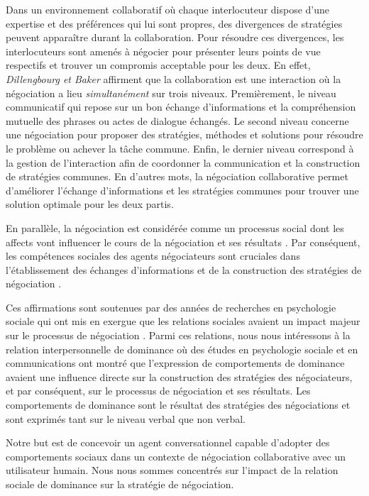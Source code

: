Dans un environnement collaboratif où chaque interlocuteur dispose d'une expertise et des préférences qui lui sont propres, des divergences de stratégies peuvent apparaître durant la collaboration. 
Pour résoudre ces divergences, les interlocuteurs sont amenés à négocier pour présenter leurs points de vue respectifs et trouver un compromis acceptable pour les deux.  
En effet, \emph{Dillengbourg et Baker} \cite{dillenbourg1996negotiation} affirment que la collaboration est une interaction où la négociation a lieu \textit{simultanément} sur trois niveaux. Premièrement, le niveau communicatif qui repose sur un bon échange d'informations et la compréhension mutuelle des phrases ou actes de dialogue échangés. Le second niveau concerne une négociation pour proposer des stratégies, méthodes et solutions pour résoudre le problème ou achever la tâche commune. Enfin, le dernier niveau correspond à la gestion de l'interaction afin de coordonner la communication et la construction de stratégies communes. En d'autres mots, la négociation collaborative permet d'améliorer l'échange d'informations et les stratégies communes pour trouver une solution optimale pour les deux partis. 

En parallèle, la négociation est  considérée comme un processus social dont les affects vont influencer le cours de la négociation et ses résultats \cite{broekens2010affective}. Par conséquent, les compétences sociales des agents négociateurs sont cruciales dans l'établissement des échanges d'informations et de la construction des stratégies de négociation \cite{jin2010study}. 

Ces affirmations sont soutenues par des années de recherches en psychologie sociale qui ont mis en exergue que les relations sociales avaient un impact majeur sur le processus de négociation \cite{thompson2010negotiation}. Parmi ces relations, nous nous intéressons à la relation interpersonnelle de dominance où des études en psychologie sociale et en communications ont montré que l'expression de comportements de dominance avaient une influence directe sur la construction des stratégies des négociateurs, et par conséquent, sur le processus de négociation et ses résultats.
Les comportements de dominance sont le résultat des stratégies des négociations et sont exprimés tant sur le niveau verbal que non verbal.

Notre but est de concevoir un agent conversationnel capable d'adopter des comportements sociaux dans un contexte de négociation collaborative avec un utilisateur humain. Nous nous sommes concentrés sur l'impact de la relation sociale de dominance sur la stratégie de négociation.


